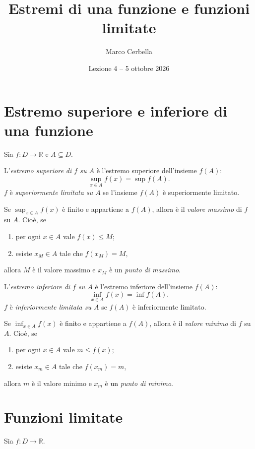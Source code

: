 \documentclass[11pt,a4paper]{article}
\title{Estremi di una funzione e funzioni limitate}
\author{Marco Cerbella}
\date{Lezione 4 -- 5 ottobre 2026}
\theoremstyle{definition}
\begin{document}
\maketitle

\section{Estremo superiore e inferiore di una funzione}

Sia $f : D \to \mathbb{R}$ e $A \subseteq D$.

\begin{definizione}
L'\emph{estremo superiore di $f$ su $A$} è l'estremo superiore dell'insieme $f(A)$:
\[
\sup_{x \in A} f(x) = \sup f(A).
\]
$f$ è \emph{superiormente limitata su $A$} se l'insieme $f(A)$ è superiormente limitato.
\end{definizione}

Se $\sup_{x \in A} f(x)$ è finito e appartiene a $f(A)$, allora è il \emph{valore massimo} di $f$ su $A$. Cioè, se
\begin{enumerate}
    \item per ogni $x \in A$ vale $f(x) \leq M$;
    \item esiste $x_M \in A$ tale che $f(x_M) = M$,
\end{enumerate}
allora $M$ è il valore massimo e $x_M$ è un \emph{punto di massimo}.

\begin{definizione}
L'\emph{estremo inferiore di $f$ su $A$} è l'estremo inferiore dell'insieme $f(A)$:
\[
\inf_{x \in A} f(x) = \inf f(A).
\]
$f$ è \emph{inferiormente limitata su $A$} se $f(A)$ è inferiormente limitato.
\end{definizione}

Se $\inf_{x \in A} f(x)$ è finito e appartiene a $f(A)$, allora è il \emph{valore minimo} di $f$ su $A$. Cioè, se
\begin{enumerate}
    \item per ogni $x \in A$ vale $m \leq f(x)$;
    \item esiste $x_m \in A$ tale che $f(x_m) = m$,
\end{enumerate}
allora $m$ è il valore minimo e $x_m$ è un \emph{punto di minimo}.

\section{Funzioni limitate}

Sia $f : D \to \mathbb{R}$.
\end{document}
